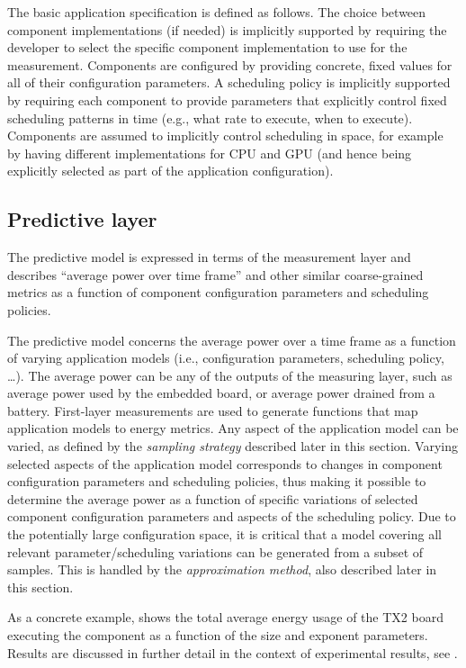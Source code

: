 The basic application specification is defined as follows. The choice between component implementations (if needed) is implicitly supported by requiring the developer to select the specific component implementation to use for the measurement. Components are configured by providing concrete, fixed values for all of their configuration parameters. A scheduling policy is implicitly supported by requiring each component to provide parameters that explicitly control fixed scheduling patterns in time (e.g., what rate to execute, when to execute). Components are assumed to implicitly control scheduling in space, for example by having different implementations for CPU and GPU (and hence being explicitly selected as part of the application configuration).

\subsection{\color{cyan}Predictive layer}

The predictive model is expressed in terms of the measurement layer and describes ``average power over time frame'' and other similar coarse-grained metrics as a function of component configuration parameters and scheduling policies.

The predictive model concerns the average power over a time frame as a function of varying application models (i.e., configuration parameters, scheduling policy, \dots). The average power can be any of the outputs of the measuring layer, such as average power used by the embedded board, or average power drained from a battery. First-layer measurements are used to generate functions that map application models to energy metrics. Any aspect of the application model can be varied, as defined by the \emph{sampling strategy} described later in this section. Varying selected aspects of the application model corresponds to changes in component configuration parameters and scheduling policies, thus making it possible to determine the average power as a function of specific variations of selected component configuration parameters and aspects of the scheduling policy. Due to the potentially large configuration space, it is critical that a model covering all relevant parameter/scheduling variations can be generated from a subset of samples. This is handled by the \emph{approximation method}, also described later in this section.

As a concrete example,  shows the total average energy usage of the TX2 board executing the  component as a function of the size and exponent parameters. Results are discussed in further detail in the context of experimental results, see .

